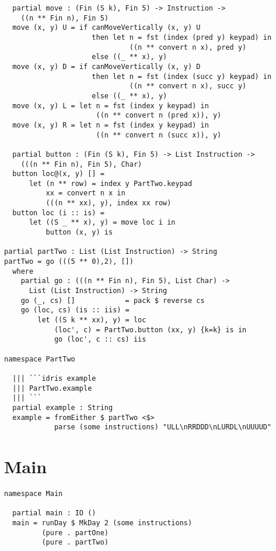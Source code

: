 \documentclass[b5paper,twoside]{amsbook}
\begin{document}
\newpage

\begin{verbatim}
  partial move : (Fin (S k), Fin 5) -> Instruction ->
    ((n ** Fin n), Fin 5)
  move (x, y) U = if canMoveVertically (x, y) U
                     then let n = fst (index (pred y) keypad) in
                              ((n ** convert n x), pred y)
                     else ((_ ** x), y)
  move (x, y) D = if canMoveVertically (x, y) D
                     then let n = fst (index (succ y) keypad) in
                              ((n ** convert n x), succ y)
                     else ((_ ** x), y)
  move (x, y) L = let n = fst (index y keypad) in
                      ((n ** convert n (pred x)), y)
  move (x, y) R = let n = fst (index y keypad) in
                      ((n ** convert n (succ x)), y)

  partial button : (Fin (S k), Fin 5) -> List Instruction ->
    (((n ** Fin n), Fin 5), Char)
  button loc@(x, y) [] =
      let (n ** row) = index y PartTwo.keypad
          xx = convert n x in
          (((n ** xx), y), index xx row)
  button loc (i :: is) =
      let ((S _ ** x), y) = move loc i in
          button (x, y) is

partial partTwo : List (List Instruction) -> String
partTwo = go (((5 ** 0),2), [])
  where
    partial go : (((n ** Fin n), Fin 5), List Char) ->
      List (List Instruction) -> String
    go (_, cs) []            = pack $ reverse cs
    go (loc, cs) (is :: iis) =
        let ((S k ** xx), y) = loc
            (loc', c) = PartTwo.button (xx, y) {k=k} is in
            go (loc', c :: cs) iis

namespace PartTwo

  ||| ```idris example
  ||| PartTwo.example
  ||| ```
  partial example : String
  example = fromEither $ partTwo <$>
            parse (some instructions) "ULL\nRRDDD\nLURDL\nUUUUD"
\end{verbatim}

\section{Main}\label{main}

\begin{verbatim}
namespace Main

  partial main : IO ()
  main = runDay $ MkDay 2 (some instructions)
         (pure . partOne)
         (pure . partTwo)
\end{verbatim}
\end{document}
